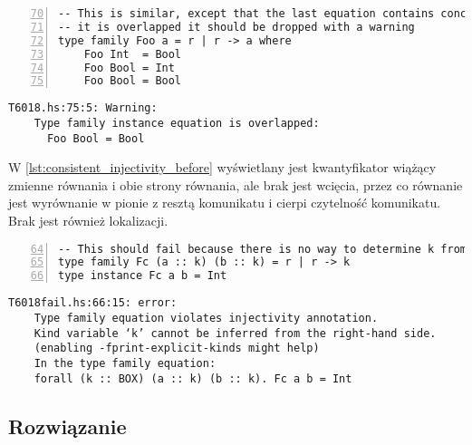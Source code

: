 \begin{lstlisting}[float,numbers=left,firstnumber=70,label={lst:consistent_overlapped_code},
                   caption={Fragment testu T6018 z zamkniętą rodziną typów z równaniami o nachodzących na siebie dziedzinach.}]
-- This is similar, except that the last equation contains concrete type.  Since
-- it is overlapped it should be dropped with a warning
type family Foo a = r | r -> a where
    Foo Int  = Bool
    Foo Bool = Int
    Foo Bool = Bool
\end{lstlisting}

\begin{lstlisting}[float,language={},label={lst:consistent_overlapped_before},
                   caption={Ostrzeżenie generowane przez kompilator w przypadku \ref{lst:consistent_overlapped_code} przed wprowadzeniem zmian.}]
T6018.hs:75:5: Warning:
    Type family instance equation is overlapped:
      Foo Bool = Bool
\end{lstlisting}

W \ref{lst:consistent_injectivity_before} wyświetlany jest kwantyfikator wiążący zmienne równania i obie strony równania, ale brak jest wcięcia, przez co równanie jest wyrównanie w pionie z resztą komunikatu i cierpi czytelność komunikatu. Brak jest również lokalizacji.

\begin{lstlisting}[float,numbers=left,firstnumber=64,label={lst:consistent_injectivity_code},
                   caption={Fragment testu T6018fail z równaniem rodziny typów nie spełniającej warunku różnowartościowości.}]
-- This should fail because there is no way to determine k from the RHS
type family Fc (a :: k) (b :: k) = r | r -> k
type instance Fc a b = Int
\end{lstlisting}

\begin{lstlisting}[float,language={},label={lst:consistent_injectivity_before},
                   caption={Błąd generowany przez kompilator w przypadku \ref{lst:consistent_injectivity_code} przed wprowadzeniem zmian.}]
T6018fail.hs:66:15: error:
    Type family equation violates injectivity annotation.
    Kind variable ‘k’ cannot be inferred from the right-hand side.
    (enabling -fprint-explicit-kinds might help)
    In the type family equation:
    forall (k :: BOX) (a :: k) (b :: k). Fc a b = Int
\end{lstlisting}


\subsection{Rozwiązanie} %


